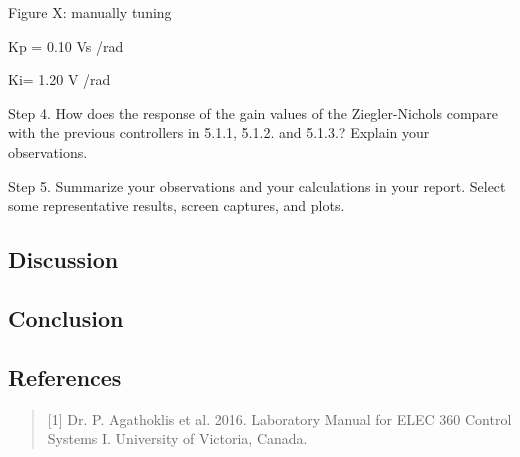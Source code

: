 \documentclass[]{article}
\begin{document}
Figure X: manually tuning

Kp = 0.10 Vs /rad

Ki= 1.20 V /rad

Step 4. How does the response of the gain values of the Ziegler-Nichols
compare with the previous controllers in 5.1.1, 5.1.2. and 5.1.3.?
Explain your observations.

Step 5. Summarize your observations and your calculations in your
report. Select some representative results, screen captures, and plots.

\subsection{Discussion}\label{discussion}

\subsection{Conclusion}\label{conclusion}

\subsection{References}\label{references}

\begin{quote}
{[}1{]} Dr. P. Agathoklis et al. 2016. Laboratory Manual for ELEC 360
Control Systems I. University of Victoria, Canada.
\end{quote}
\end{document}
